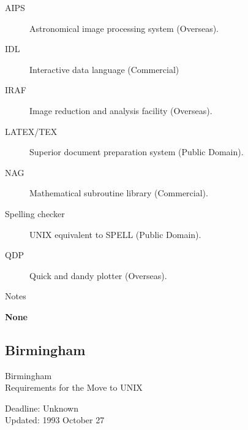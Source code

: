 \begin{description}
\item[AIPS] Astronomical image processing system (Overseas).
\item[IDL] Interactive data language (Commercial)
\item[IRAF] Image reduction and analysis facility (Overseas).
\item[LATEX/TEX] Superior document preparation system (Public Domain).
\item[NAG] Mathematical subroutine library (Commercial).
\item[Spelling checker] UNIX equivalent to SPELL (Public Domain).
\item[QDP] Quick and dandy plotter (Overseas).
\end{description}


\vspace{5mm}
\begin{center}
{\large\sc Notes}
\end{center}

{\bf None}


\newpage
\subsection{Birmingham}

\renewcommand{\starsitename}{Birmingham}
\renewcommand{\starnodename}{BHVAD}

\renewcommand{\starunixdate}{Unknown}
\renewcommand{\starupdate}{1993 October 27}

\renewcommand{\starsitetelephone}{021 414 6447}
\renewcommand{\starsitefax}{021 414 3722}

\begin{center}
{\Large\sc \starsitename \\ [2ex]
           Requirements for the Move to UNIX}

\vspace{3mm}
{\large\sc Deadline: \starunixdate \\ [1ex]
           Updated: \starupdate}
\end{center}

\vspace{5mm}

